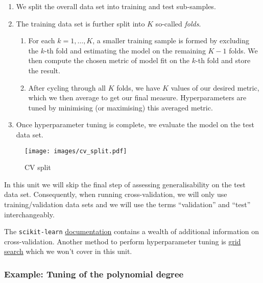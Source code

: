 \documentclass{scrartcl}
\providecommand{\tightlist}{%
      \setlength{\itemsep}{0pt}\setlength{\parskip}{0pt}}
\begin{document}
\begin{enumerate}
\def\labelenumi{\arabic{enumi}.}
\tightlist
\item
  We split the overall data set into training and test sub-samples.
\item
  The training data set is further split into \(K\) so-called
  \emph{folds}.

  \begin{enumerate}
  \def\labelenumii{\arabic{enumii}.}
  \tightlist
  \item
    For each \(k = 1,\dots,K\), a smaller training sample is formed by
    excluding the \(k\)-th fold and estimating the model on the
    remaining \(K-1\) folds. We then compute the chosen metric of model
    fit on the \(k\)-th fold and store the result.
  \item
    After cycling through all \(K\) folds, we have \(K\) values of our
    desired metric, which we then average to get our final measure.
    Hyperparameters are tuned by minimising (or maximising) this
    averaged metric.
  \end{enumerate}
\item
  Once hyperparameter tuning is complete, we evaluate the model on the
  test data set.
\end{enumerate}

    \begin{figure}
\centering
\begin{adjustbox}{max totalheight=0.4\textheight}
\texttt{[image: images/cv\_split.pdf]}
\end{adjustbox}
\caption{CV split}
\end{figure}

    In this unit we will skip the final step of assessing generalisability
on the test data set. Consequently, when running cross-validation, we
will only use training/validation data sets and we will use the terms
``validation'' and ``test'' interchangeably.

The \texttt{scikit-learn}
\href{https://scikit-learn.org/stable/modules/cross_validation.html}{documentation}
contains a wealth of additional information on cross-validation. Another
method to perform hyperparameter tuning is
\href{https://scikit-learn.org/stable/modules/grid_search.html}{grid
search} which we won't cover in this unit.

    \hypertarget{examle-tuning-of-the-polynomial-degree}{%
\subsubsection{Example: Tuning of the polynomial
degree}\label{examle-tuning-of-the-polynomial-degree}}
\end{document}
